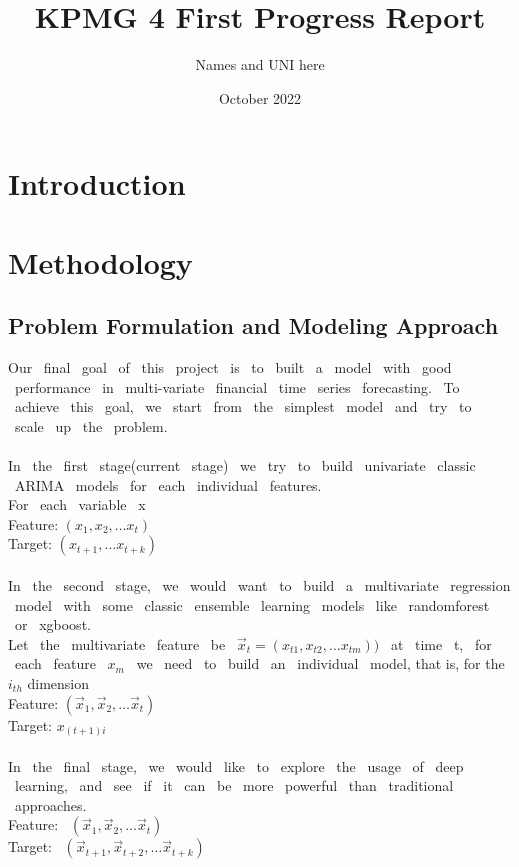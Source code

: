 \documentclass{article}
\title{KPMG 4 First Progress Report}
\author{Names and UNI here}
\date{October 2022}
\begin{document}
\maketitle

\section{Introduction}


\section{Methodology}
\subsection{Problem Formulation and Modeling Approach}
 Our  \ final \ goal \ of \ this \ project \ is \ to \ built \ a \ model \ with \ good \ performance \ in \ multi-variate \ financial \ time \ series \ forecasting. \ To \ achieve \ this \ goal,  \ we \ start \ from \ the \ simplest \ model \ and \ try \ to \ scale \ up \ the \ problem. \\ \\
 In \ the \ first \ stage(current \ stage) \ we \ try \ to \ build \ univariate \ classic \ ARIMA \ models \ for \ each \ individual \ features. \\
For \ each \ variable \ x \\
Feature: $(x_1,x_2,…x_t)$ \\
Target: $(x_{t+1},…x_{t+k})$ \\ \\In  \ the \ second \ stage, \ we \ would \ want \ to \ build \ a \ multivariate \ regression \ model \ with \ some \ classic \ ensemble \ learning \ models \ like \ randomforest \ or \ xgboost.\\Let \ the \ multivariate \ feature \ be \ $\vec{x}_{t} =(x_{t1},x_{t2},…x_{tm}))$ \ at \ time \ t, \ for \ each \ feature \ $x_{m}$ \ we \ need \ to \ build \ an \ individual \ model, that is, for the $i_{th}$ dimension\\
Feature: $(\vec{x}_1,\vec{x}_2,…\vec{x}_t)$ \\
Target: $x_{(t+1)i}$ \\ \\In \ the \ final \ stage, \ we \ would \ like \ to \ explore \ the \ usage \ of \ deep \ learning, \ and \ see \ if \ it \ can \ be \ more \ powerful \ than \ traditional \ approaches. \\Feature: \ $(\vec{x}_1,\vec{x}_2,…\vec{x}_t)$ \\Target: \ $(\vec{x}_{t+1},\vec{x}_{t+2},…\vec{x}_{t+k})$
\end{document}
